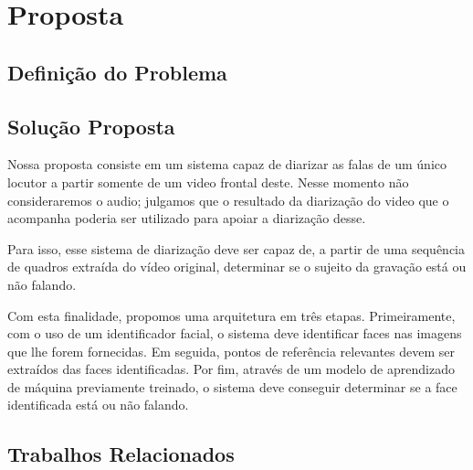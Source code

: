 \chapter{Proposta}
\label{ch:proposal}

\section{Definição do Problema}
\label{sec:problem-desc}

\section{Solução Proposta}
\label{sec:proposed-solution}

Nossa proposta consiste em um sistema capaz de diarizar as falas de um único locutor a partir somente de um video frontal deste. Nesse momento não consideraremos o audio; julgamos que o resultado da diarização do video que o acompanha poderia ser utilizado para apoiar a diarização desse.

Para isso, esse sistema de diarização deve ser capaz de, a partir de uma sequência de quadros extraída do vídeo original, determinar se o sujeito da gravação está ou não falando. 

Com esta finalidade, propomos uma arquitetura em três etapas. Primeiramente, com o uso de um identificador facial, o sistema deve identificar faces nas imagens que lhe forem fornecidas. Em seguida, pontos de referência relevantes devem ser extraídos das faces identificadas. Por fim, através de um modelo de aprendizado de máquina previamente treinado, o sistema deve conseguir determinar se a face identificada está ou não falando.

\section{Trabalhos Relacionados}
\label{sec:related-work}
